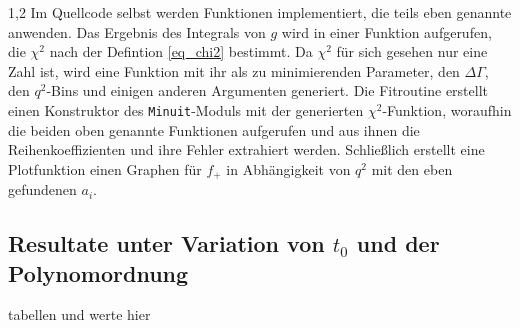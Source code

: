 \documentclass[11pt,a4paper,twoside]{report}
\begin{document}
\begin{spacing}{1,2}
\noindent
Im Quellcode selbst werden Funktionen implementiert, die teils eben genannte anwenden. Das Ergebnis des Integrals von $g$ wird in einer Funktion aufgerufen,
die $\chi^2$ nach der Defintion \eqref{eq_chi2} bestimmt. Da $\chi^2$ für sich gesehen nur eine Zahl ist, wird eine Funktion mit ihr als zu minimierenden
Parameter, den $\Delta \Gamma$, den $q^2$-Bins und einigen anderen Argumenten generiert. Die Fitroutine erstellt einen Konstruktor des \texttt{Minuit}-Moduls mit 
der generierten $\chi^2$-Funktion, woraufhin die beiden oben genannte Funktionen aufgerufen und aus ihnen die Reihenkoeffizienten und ihre Fehler 
extrahiert werden. Schließlich erstellt eine Plotfunktion einen Graphen für $f_+$ in Abhängigkeit von $q^2$ mit den eben gefundenen $a_i$. 

\subsection{Resultate unter Variation von $t_0$ und der Polynomordnung}
tabellen und werte hier


\end{spacing}
\end{document}
